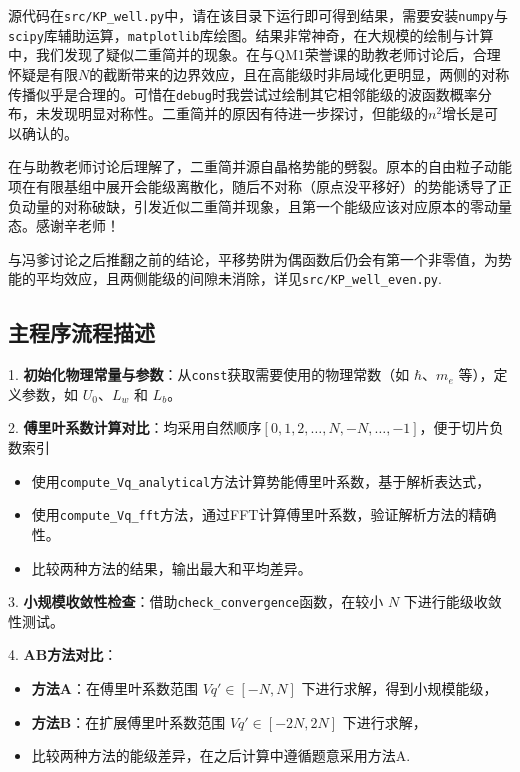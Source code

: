 源代码在\texttt{src/KP\_well.py}中，请在该目录下运行即可得到结果，需要安装\texttt{numpy}与\texttt{scipy}库辅助运算，\texttt{matplotlib}库绘图。结果非常神奇，在大规模的绘制与计算中，我们发现了疑似二重简并的现象。在与QM1荣誉课的助教老师讨论后，合理怀疑是有限$N$的截断带来的边界效应，且在高能级时非局域化更明显，两侧的对称传播似乎是合理的。可惜在\texttt{debug}时我尝试过绘制其它相邻能级的波函数概率分布，未发现明显对称性。二重简并的原因有待进一步探讨，但能级的$n^2$增长是可以确认的。

\noindent {}在与助教老师讨论后理解了，二重简并源自晶格势能的劈裂。原本的自由粒子动能项在有限基组中展开会能级离散化，随后不对称（原点没平移好）的势能诱导了正负动量的对称破缺，引发近似二重简并现象，且第一个能级应该对应原本的零动量态。感谢辛老师！

\noindent {}与冯爹讨论之后推翻之前的结论，平移势阱为偶函数后仍会有第一个非零值，为势能的平均效应，且两侧能级的间隙未消除，详见\texttt{src/KP\_well\_even.py}.

\subsection*{主程序流程描述}

1. \textbf{初始化物理常量与参数}：从\texttt{const}获取需要使用的物理常数（如 $\hbar$、$m_e$ 等），定义参数，如 $U_0$、$L_w$ 和 $L_b$。
   
2. \textbf{傅里叶系数计算对比}：均采用自然顺序$[0,1,2,\dots,N,-N,\dots,-1]$，便于切片负数索引
   \begin{itemize}
       \item 使用\texttt{compute\_Vq\_analytical}方法计算势能傅里叶系数，基于解析表达式，
       \item 使用\texttt{compute\_Vq\_fft}方法，通过FFT计算傅里叶系数，验证解析方法的精确性。
       \item 比较两种方法的结果，输出最大和平均差异。
   \end{itemize}
   
3. \textbf{小规模收敛性检查}：借助\texttt{check\_convergence}函数，在较小 $N$ 下进行能级收敛性测试。

4. \textbf{AB方法对比}：
   \begin{itemize}
       \item \textbf{方法A}：在傅里叶系数范围 $Vq' \in [-N, N]$ 下进行求解，得到小规模能级，
       \item \textbf{方法B}：在扩展傅里叶系数范围 $Vq' \in [-2N, 2N]$ 下进行求解，
       \item 比较两种方法的能级差异，在之后计算中遵循题意采用方法A.
   \end{itemize}

